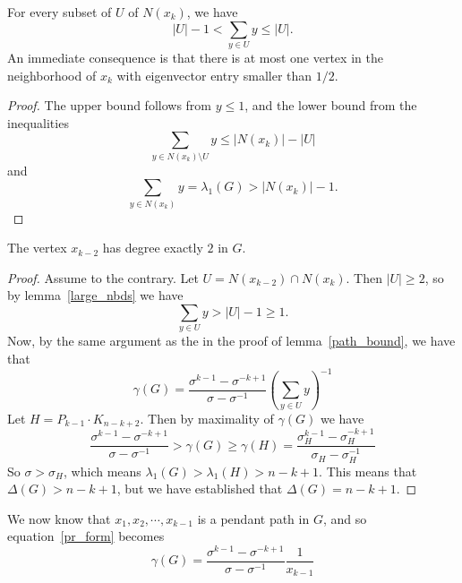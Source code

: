 \begin{lemma}\label{large_nbds}
  For every subset of $U$ of $N(x_k)$, we have
   \[ |U| - 1 < \sum_{y \in U} y \leq |U|. \]
  An immediate consequence is that there is at most one
  vertex in the neighborhood of $x_k$ with eigenvector
  entry smaller than $1/2$.
\end{lemma}
\begin{proof}
  The upper bound follows from $y \leq 1$, and the lower bound from
  the inequalities
   \[ \sum_{y \in N(x_k) \setminus U} y  \leq |N(x_k)| - |U|\]
  and
   \[ \sum_{y \in N(x_k)} y = \lambda_1(G) > |N(x_k)| - 1 .\]
\end{proof}

\begin{lemma}\label{k_2_lemma}
 The vertex $x_{k-2}$ has degree exactly $2$ in $G$.
\end{lemma}
\begin{proof}
  Assume to the contrary.  Let $U = N(x_{k-2}) \cap N(x_{k})$.  Then
  $|U| \geq 2$, so by lemma~\ref{large_nbds} we have
   \[ \sum_{y \in U} y > |U| - 1 \geq 1 . \]
  Now, by the same argument as the in the proof of lemma~\ref{path_bound},
  we have that
   \[ \gamma(G) = \frac{\sigma^{k-1} - \sigma^{-k+1}}{\sigma - \sigma^{-1}} \left( \sum_{y \in U} y \right)^{-1} \]
  Let $H = P_{k-1} \cdot K_{n-k+2}$.  Then by maximality of $\gamma(G)$ we have
  \begin{equation*}
   \frac{\sigma^{k-1} - \sigma^{-k+1}}{\sigma - \sigma^{-1}} > \gamma(G) \geq \gamma(H) = \frac{\sigma_H^{k-1} - \sigma_H^{-k+1}}{\sigma_H - \sigma_H^{-1}} 
  \end{equation*}
  So $\sigma > \sigma_H$, which means $\lambda_1(G) > \lambda_1(H) > n-k+1$.
  This means that $\Delta(G) > n-k+1$, but we have established that
  $\Delta(G) = n-k+1$.
\end{proof}

We now know that $x_1, x_2, \cdots, x_{k-1}$ is a pendant path in $G$, and
so equation~\ref{pr_form} becomes
\begin{equation}\label{pr_form2}
 \gamma(G) = \frac{\sigma^{k-1} - \sigma^{-k+1}}{\sigma-\sigma^{-1}} \frac{1}{x_{k-1}}
\end{equation}

